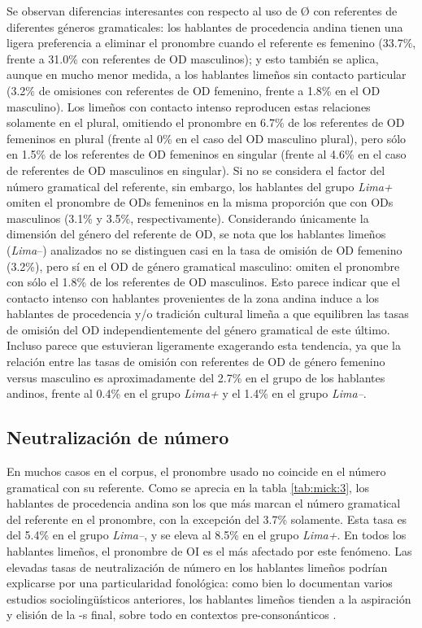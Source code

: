 \documentclass[output=paper]{../langscibook}
\begin{document}
Se observan diferencias interesantes con respecto al uso de Ø con referentes de diferentes géneros gramaticales: los hablantes de procedencia andina tienen una ligera preferencia a eliminar el pronombre cuando el referente es femenino (33.7\%, frente a 31.0\% con referentes de OD masculinos); y esto también se aplica, aunque en mucho menor medida, a los hablantes limeños sin contacto particular (3.2\% de omisiones con referentes de OD femenino, frente a 1.8\% en el OD masculino). Los limeños con contacto intenso reproducen estas relaciones solamente en el plural, omitiendo el pronombre en 6.7\% de los referentes de OD femeninos en plural (frente al 0\% en el caso del OD masculino plural), pero sólo en 1.5\% de los referentes de OD femeninos en singular (frente al 4.6\% en el caso de referentes de OD masculinos en singular). Si no se considera el factor del número gramatical del referente, sin embargo, los hablantes del grupo \textit{Lima+} omiten el pronombre de ODs femeninos en la misma proporción que con ODs masculinos (3.1\% y 3.5\%, respectivamente). Considerando únicamente la dimensión del género del referente de OD, se nota que los hablantes limeños (\textit{Lima}–) analizados no se distinguen casi en la tasa de omisión de OD femenino (3.2\%), pero sí en el OD de género gramatical masculino: omiten el pronombre con sólo el 1.8\% de los referentes de OD masculinos. Esto parece indicar que el contacto intenso con hablantes provenientes de la zona andina induce a los hablantes de procedencia y/o tradición cultural limeña a que equilibren las tasas de omisión del OD independientemente del género gramatical de este último. Incluso parece que estuvieran ligeramente exagerando esta tendencia, ya que la relación entre las tasas de omisión con referentes de OD de género femenino versus masculino es aproximadamente del 2.7\% en el grupo de los hablantes andinos, frente al 0.4\% en el grupo \textit{Lima+} y el 1.4\% en el grupo \textit{Lima–}.

\subsection{Neutralización de número}

En muchos casos en el corpus, el pronombre usado no coincide en el número gramatical con su referente. Como se aprecia en la tabla \ref{tab:mick:3}, los hablantes de procedencia andina son los que más marcan el número gramatical del referente en el pronombre, con la excepción del 3.7\% solamente. Esta tasa es del 5.4\% en el grupo \textit{Lima–}, y se eleva al 8.5\% en el grupo \textit{Lima+}. En todos los hablantes limeños, el pronombre de OI es el más afectado por este fenómeno. Las elevadas tasas de neutralización de número en los hablantes limeños podrían explicarse por una particularidad fonológica: como bien lo documentan varios estudios sociolingüísticos anteriores, los hablantes limeños tienden a la aspiración y elisión de la -s final, sobre todo en contextos pre-consonánticos \citep{Caravedo1990}.
\end{document}
